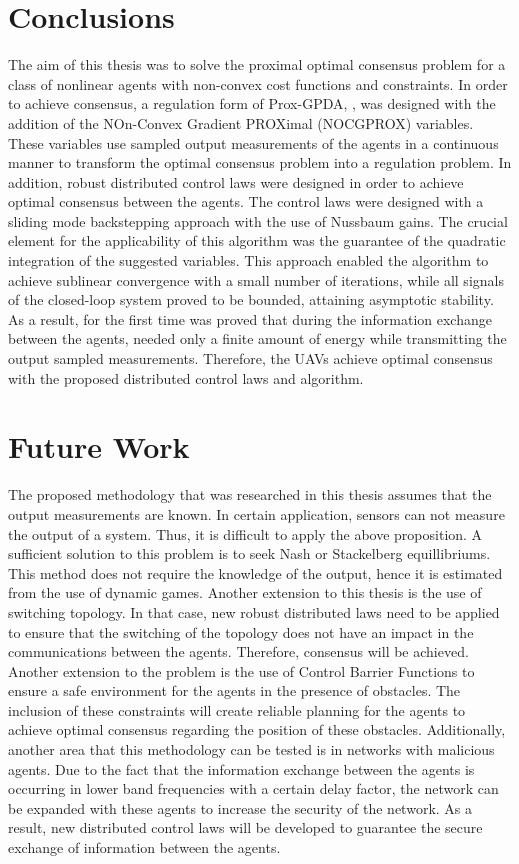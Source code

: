 \section{Conclusions}

    The aim of this thesis was to solve the proximal optimal consensus problem for a class of nonlinear agents with non-convex cost functions and constraints. In order to achieve consensus, a regulation form of Prox-GPDA, \cite{pmlr-v70-hong17a}, was designed with the addition of the NOn-Convex Gradient PROXimal (NOCGPROX) variables. These variables use sampled output measurements of the agents in a continuous manner to transform the optimal consensus problem into a regulation problem. In addition, robust distributed control laws were designed in order to achieve optimal consensus between the agents. The control laws were designed with a sliding mode backstepping approach with the use of Nussbaum gains. The crucial element for the applicability of this algorithm was the guarantee of the quadratic integration of the suggested variables. This approach enabled the algorithm to achieve sublinear convergence with a small number of iterations, while all signals of the closed-loop system proved to be bounded, attaining asymptotic stability. As a result, for the first time was proved that during the information exchange between the agents, needed only a finite amount of energy while transmitting the output sampled measurements. Therefore, the UAVs achieve optimal consensus with the proposed distributed control laws and algorithm.

\newpage
\section{Future Work}

    The proposed methodology that was researched in this thesis assumes that the output measurements are known. In certain application, sensors can not measure the output of a system. Thus, it is difficult to apply the above proposition. A sufficient solution to this problem is to seek Nash or Stackelberg equillibriums. This method does not require the knowledge of the output, hence it is estimated from the use of dynamic games. Another extension to this thesis is the use of switching topology. In that case, new robust distributed laws need to be applied to ensure that the switching of the topology does not have an impact in the communications between the agents. Therefore, consensus will be achieved. Another extension to the problem is the use of Control Barrier Functions to ensure a safe environment for the agents in the presence of obstacles. The inclusion of these constraints will create reliable planning for the agents to achieve optimal consensus regarding the position of these obstacles. Additionally, another area that this methodology can be tested is in networks with malicious agents. Due to the fact that the information exchange between the agents is occurring in lower band frequencies with a certain delay factor, the network can be expanded with these agents to increase the security of the network. As a result, new distributed control laws will be developed to guarantee the secure exchange of information between the agents. 